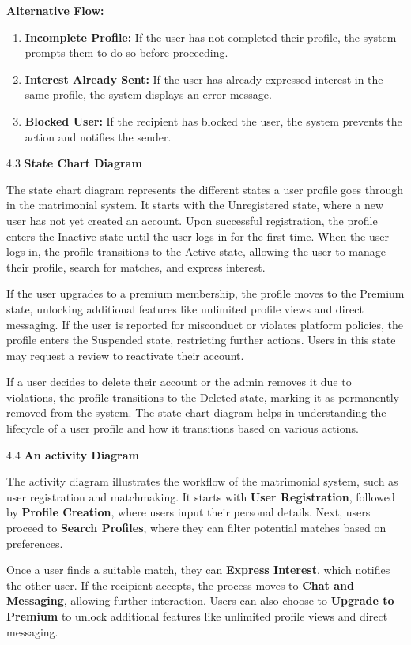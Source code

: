 \textbf{Alternative Flow:}

\begin{enumerate}
\def\labelenumi{\arabic{enumi}.}
\item
  \textbf{Incomplete Profile:} If the user has not completed their
  profile, the system prompts them to do so before proceeding.
\item
  \textbf{Interest Already Sent:} If the user has already expressed
  interest in the same profile, the system displays an error message.
\item
  \textbf{Blocked User:} If the recipient has blocked the user, the
  system prevents the action and notifies the sender.
\end{enumerate}

4.3 \textbf{State Chart Diagram}

The state chart diagram represents the different states a user profile
goes through in the matrimonial system. It starts with the Unregistered
state, where a new user has not yet created an account. Upon successful
registration, the profile enters the Inactive state until the user logs
in for the first time. When the user logs in, the profile transitions to
the Active state, allowing the user to manage their profile, search for
matches, and express interest.

If the user upgrades to a premium membership, the profile moves to the
Premium state, unlocking additional features like unlimited profile
views and direct messaging. If the user is reported for misconduct or
violates platform policies, the profile enters the Suspended state,
restricting further actions. Users in this state may request a review to
reactivate their account.

If a user decides to delete their account or the admin removes it due to
violations, the profile transitions to the Deleted state, marking it as
permanently removed from the system. The state chart diagram helps in
understanding the lifecycle of a user profile and how it transitions
based on various actions.

4.4 \textbf{An activity Diagram}

The activity diagram illustrates the workflow of the matrimonial system,
such as user registration and matchmaking. It starts with \textbf{User
Registration}, followed by \textbf{Profile Creation}, where users input
their personal details. Next, users proceed to \textbf{Search Profiles},
where they can filter potential matches based on preferences.

Once a user finds a suitable match, they can \textbf{Express Interest},
which notifies the other user. If the recipient accepts, the process
moves to \textbf{Chat and Messaging}, allowing further interaction.
Users can also choose to \textbf{Upgrade to Premium} to unlock
additional features like unlimited profile views and direct messaging.

